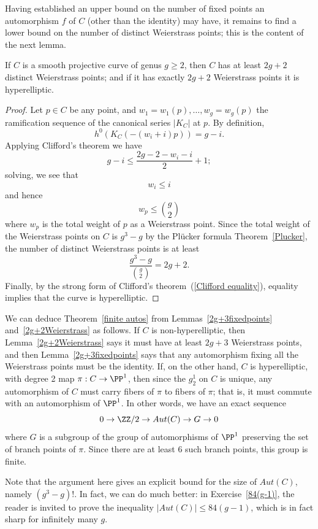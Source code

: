 Having established an upper  bound on the number of fixed points an automorphism $f$ of $C$ (other than the identity) may have, it remains to find a lower bound on the number of distinct Weierstrass points; this is the content of the next lemma.


\begin{lemma}\label{2g+2Weierstrass}
If $C$ is a smooth projective curve of genus $g \geq 2$, then $C$ has at least $2g+2$ distinct Weierstrass points; and if it has exactly $2g+2$ Weierstrass points it is hyperelliptic.
\end{lemma}

\begin{proof}
Let $p \in C$ be any point, and $w_1=w_1(p),\dots,w_g = w_g(p)$ the ramification sequence of the canonical series $|K_C|$ at $p$. By definition, 
$$
h^0(K_C(-(w_i+i)p)) = g - i.
$$
Applying Clifford's theorem we have
$$
g-i \leq \frac{2g - 2 - w_i - i}{2} + 1;
$$
solving, we see that
$$
w_i \leq i
$$
and hence
$$
w_p \leq \binom{g}{2}
$$
where $w_p$ is the total weight of $p$ as a Weierstrass point. Since the total weight of the Weierstrass points on $C$ is $g^3-g$ by the Pl\"ucker formula Theorem~\ref{Plucker}, the number of distinct Weierstrass points is at least
$$
\frac{g^3-g}{\binom{g}{2}} = 2g+2.
$$
Finally, by the strong form of Clifford's theorem~(\ref{Clifford equality}), equality implies that the curve is hyperelliptic.
\end{proof}

We can deduce Theorem~\ref{finite autos} from Lemmas~\ref{2g+3fixedpoints} and~\ref{2g+2Weierstrass} as follows. If $C$ is non-hyperelliptic, then Lemma~\ref{2g+2Weierstrass} says it must have at least $2g+3$ Weierstrass points, and then Lemma~\ref{2g+3fixedpoints} says that any automorphism fixing all the Weierstrass points must be the identity. If, on the other hand, $C$ is hyperelliptic, with degree 2 map $\pi : C \to \PP^1$, then since the $g^1_2$ on $C$ is unique, any automorphism of $C$ must carry fibers of $\pi$ to fibers of $\pi$; that is, it must commute with an automorphism of $\PP^1$. In other words, we have an exact sequence
$$
0 \to \ZZ/2 \to Aut(C) \to G \to 0
$$
where $G$ is a subgroup of the group of automorphisms of $\PP^1$ preserving  the set of branch points of $\pi$. Since there are at least 6 such branch points, this group is finite.

Note that the argument here gives an explicit bound for the size of $Aut(C)$, namely $(g^3-g)!$. In fact, we can do much better: in Exercise~\ref{84(g-1)}, the reader is invited to prove the inequality $|Aut(C)| \leq 84(g-1)$, which is in fact sharp for infinitely many $g$.

